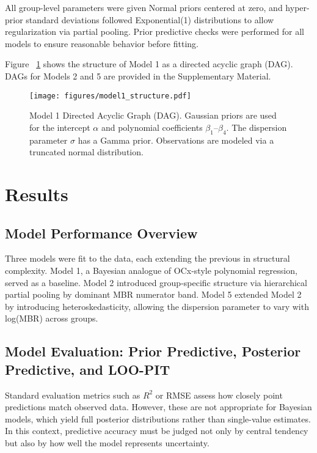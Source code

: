 \documentclass[preprint,authoryear]{elsarticle}
\begin{document}
All group-level parameters were given Normal priors centered at zero, and hyper-prior standard deviations followed Exponential(1) distributions to allow regularization via partial pooling. Prior predictive checks were performed for all models to ensure reasonable behavior before fitting.

Figure ~\ref{fig:model1-struct} shows the structure of Model 1 as a directed acyclic graph (DAG). DAGs for Models 2 and 5 are provided in the Supplementary Material.

\begin{figure}[H]
\centering
\texttt{[image: figures/model1\_structure.pdf]}
\caption{Model 1 Directed Acyclic Graph (DAG). Gaussian priors are used for the intercept $\alpha$ and polynomial coefficients $\beta_1$--$\beta_4$. The dispersion parameter $\sigma$ has a Gamma prior. Observations are modeled via a truncated normal distribution.}
\label{fig:model1-struct}
\end{figure}


\section{Results}

\subsection{Model Performance Overview}

Three models were fit to the data, each extending the previous in structural complexity. Model 1, a Bayesian analogue of OCx-style polynomial regression, served as a baseline. Model 2 introduced group-specific structure via hierarchical partial pooling by dominant MBR numerator band. Model 5 extended Model 2 by introducing heteroskedasticity, allowing the dispersion parameter to vary with log(MBR) across groups. 



\subsection{Model Evaluation: Prior Predictive, Posterior Predictive, and LOO-PIT}

Standard evaluation metrics such as $R^2$ or RMSE assess how closely point predictions match observed data. However, these are not appropriate for Bayesian models, which yield full posterior distributions rather than single-value estimates. In this context, predictive accuracy must be judged not only by central tendency but also by how well the model represents uncertainty.
\end{document}
